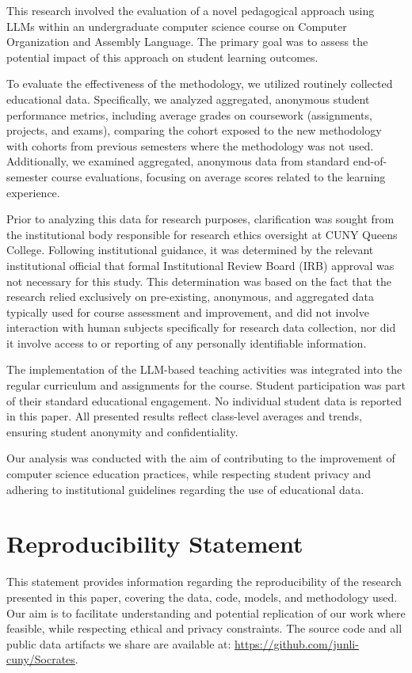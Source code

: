 \documentclass{article} %
\begin{document}
This research involved the evaluation of a novel pedagogical approach using LLMs within an undergraduate computer science course on Computer Organization and Assembly Language. The primary goal was to assess the potential impact of this approach on student learning outcomes.

To evaluate the effectiveness of the methodology, we utilized routinely collected educational data. Specifically, we analyzed aggregated, anonymous student performance metrics, including average grades on coursework (assignments, projects, and exams), comparing the cohort exposed to the new methodology with cohorts from previous semesters where the methodology was not used. Additionally, we examined aggregated, anonymous data from standard end-of-semester course evaluations, focusing on average scores related to the learning experience.

Prior to analyzing this data for research purposes, clarification was sought from the institutional body responsible for research ethics oversight at CUNY Queens College. Following institutional guidance, it was determined by the relevant institutional official that formal Institutional Review Board (IRB) approval was not necessary for this study. This determination was based on the fact that the research relied exclusively on pre-existing, anonymous, and aggregated data typically used for course assessment and improvement, and did not involve interaction with human subjects specifically for research data collection, nor did it involve access to or reporting of any personally identifiable information.

The implementation of the LLM-based teaching activities was integrated into the regular curriculum and assignments for the course. Student participation was part of their standard educational engagement. No individual student data is reported in this paper. All presented results reflect class-level averages and trends, ensuring student anonymity and confidentiality.

Our analysis was conducted with the aim of contributing to the improvement of computer science education practices, while respecting student privacy and adhering to institutional guidelines regarding the use of educational data.

\section*{Reproducibility Statement}


This statement provides information regarding the reproducibility of the research presented in this paper, covering the data, code, models, and methodology used. Our aim is to facilitate understanding and potential replication of our work where feasible, while respecting ethical and privacy constraints. The source code and all public data artifacts we share are available at: \url{https://github.com/junli-cuny/Socrates}.
\end{document}
